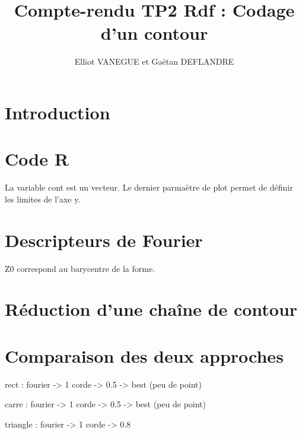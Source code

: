 \documentclass{article}
\title{Compte-rendu TP2 Rdf : Codage d'un contour}
\author{Elliot VANEGUE et Gaëtan DEFLANDRE}
\begin{document}


  \maketitle
  
  \mbox{}
  \newpage
  \clearpage
  
  \section{Introduction}
  
  \section{Code R}
  La variable cont est un vecteur.
  Le dernier parmaètre de plot permet de définir les limites de l'axe y. 
  \section{Descripteurs de Fourier}
  Z0 correspond au barycentre de la forme.
  \section{Réduction d'une chaîne de contour}
  \section{Comparaison des deux approches}
  rect :
    fourier -> 1
    corde -> 0.5 -> best (peu de point)
    
  carre :
    fourier -> 1
    corde -> 0.5 -> best (peu de point)
    
  triangle :
    fourier -> 1
    corde -> 0.8
    
\end{document}
